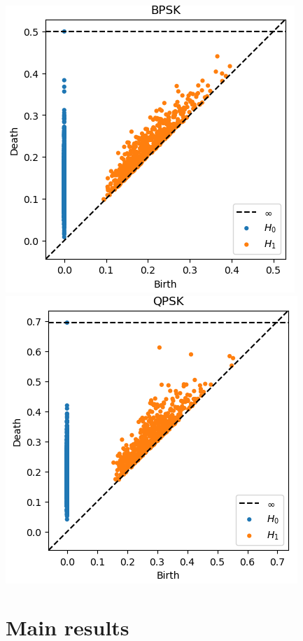 \documentclass[12pt]{article}
\theoremstyle{plain}
\theoremstyle{definition}
\theoremstyle{remark}
\begin{document}
	\includegraphics[scale=0.6]{BPSK_diagram.png}	\includegraphics[scale=0.6]{QPSK_diagram.png}
	
	\section{Main results}
	
\end{document}
